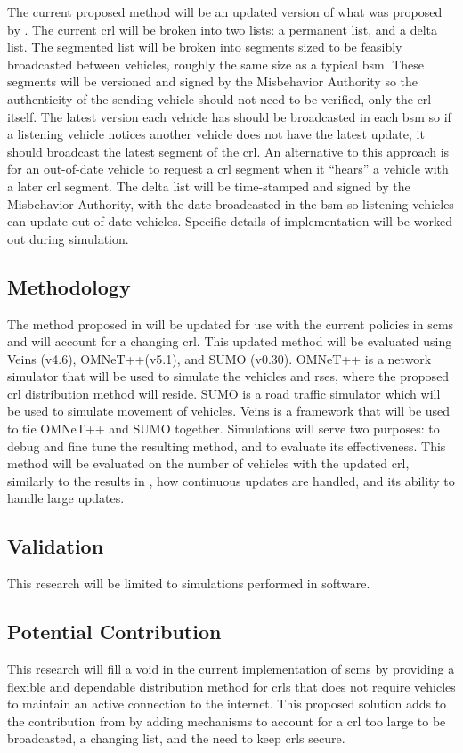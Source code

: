 \documentclass {article}
\begin{document}
The current proposed method will be an updated version of what was proposed by \autocite{haas_efficient_2011}. The current \gls{crl} will be broken into two lists: a permanent list, and a delta list. The segmented list will be broken into segments sized to be feasibly broadcasted between vehicles, roughly the same size as a typical \gls{bsm}. These segments will be versioned and signed by the Misbehavior Authority so the authenticity of the sending vehicle should not need to be verified, only the \gls{crl} itself. The latest version each vehicle has should be broadcasted in each \gls{bsm} so if a listening vehicle notices another vehicle does not have the latest update, it should broadcast the latest segment of the \gls{crl}. An alternative to this approach is for an out-of-date vehicle to request a \gls{crl} segment when it ``hears'' a vehicle with a later \gls{crl} segment. The delta list will be time-stamped and signed by the Misbehavior Authority, with the date broadcasted in the \gls{bsm} so listening vehicles can update out-of-date vehicles. Specific details of implementation will be worked out during simulation.

\subsection{Methodology}
The method proposed in \autocite{haas_efficient_2011} will be updated for use with the current policies in \gls{scms} and will account for a changing \gls{crl}. This updated method will be evaluated using Veins (v4.6), OMNeT++(v5.1), and SUMO (v0.30). OMNeT++ is a network simulator that will be used to simulate the vehicles and \gls{rse}s, where the proposed \gls{crl} distribution method will reside. SUMO is a road traffic simulator which will be used to simulate movement of vehicles. Veins is a framework that will be used to tie OMNeT++ and SUMO together. Simulations will serve two purposes: to debug and fine tune the resulting method, and to evaluate its effectiveness. This method will be evaluated on the number of vehicles with the updated \gls{crl}, similarly to the results in \autocite{haas_efficient_2011}, how continuous updates are handled, and its ability to handle large updates.

\subsection{Validation}
This research will be limited to simulations performed in software. 

\subsection{Potential Contribution}
This research will fill a void in the current implementation of \gls{scms} by providing a flexible and dependable distribution method for \gls{crl}s that does not require vehicles to maintain an active connection to the internet. This proposed solution adds to the contribution from \autocite{haas_efficient_2011} by adding mechanisms to account for a \gls{crl} too large to be broadcasted, a changing list, and the need to keep \gls{crl}s secure.
\end{document}
